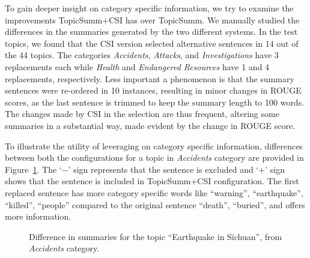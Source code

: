 To gain deeper insight on category specific information, we try to examine the improvements TopicSumm+CSI has over TopicSumm. We manually studied the differences in the summaries generated by the two different systems.
In the test topics, we found that the CSI version selected alternative sentences in 14 out of the 44 topics. The categories \emph{Accidents}, \emph{Attacks}, and \emph{Investigations} have 3 replacements each while \emph{Health} and \emph{Endangered Resources} have 1 and 4 replacements, respectively.  Less important a phenomenon is that the summary sentences were re-ordered in 10 instances, resulting in minor changes in ROUGE scores, as the last sentence is  trimmed to keep the summary length to 100 words.  The changes made by CSI in the selection are thus frequent, altering some summaries in a substantial way, made evident by the change in ROUGE score. 

To illustrate the utility of leveraging on category specific information, differences between both the configurations for a topic in \emph{Accidents} category are provided in Figure~\ref{figure:csi_summaries}. 
The `$-$' sign represents that the sentence is excluded and `$+$' sign shows that the sentence is included in TopicSumm+CSI configuration. The first replaced sentence has more category specific words like ``warning'', ``earthquake'', ``killed'', ``people'' compared to the original sentence ``death'', ``buried'', and offers more information.

\begin{figure}[h]
    \centering
{}
\caption{Difference in summaries for the topic ``Earthquake in Sichuan'', from \emph{Accidents} category.}
\label{figure:csi_summaries}
\end{figure}


